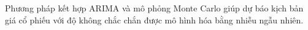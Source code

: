Phương pháp kết hợp ARIMA và mô phỏng Monte Carlo giúp dự báo kịch bản giá cổ phiếu với độ không chắc chắn được mô hình hóa bằng nhiễu ngẫu nhiên.




